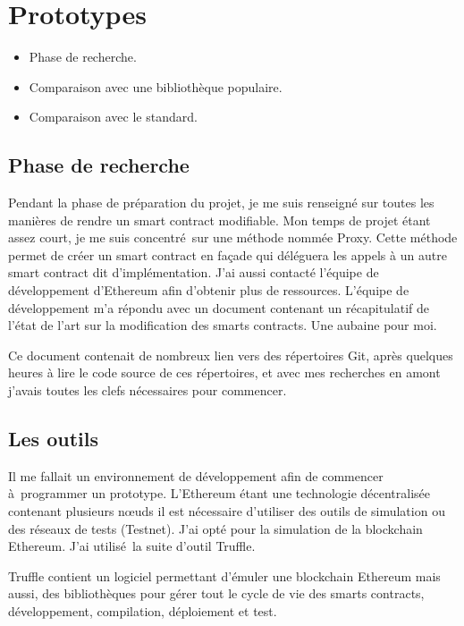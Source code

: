 \section{Prototypes}

\begin{itemize}
    \item Phase de recherche.
    \item Comparaison avec une bibliothèque populaire.
    \item Comparaison avec le standard.
\end{itemize}

\subsection{Phase de recherche}

Pendant la phase de préparation du projet, je me suis renseigné sur toutes les manières de rendre un smart contract modifiable.
Mon temps de projet étant assez court, je me suis concentré sur une méthode nommée Proxy. Cette méthode permet de créer un
smart contract en façade qui déléguera les appels à un autre smart contract dit d'implémentation. J'ai aussi contacté
l'équipe de développement d'Ethereum afin d'obtenir plus de ressources. L'équipe de développement m'a répondu avec un document
contenant un récapitulatif de l'état de l'art sur la modification des smarts contracts. Une aubaine pour moi.

Ce document contenait de nombreux lien vers des répertoires Git, après quelques heures à lire le code source de ces répertoires,
et avec mes recherches en amont j'avais toutes les clefs nécessaires pour commencer. 

\subsection{Les outils}

Il me fallait un environnement de développement afin de commencer à programmer un prototype. L'Ethereum étant une technologie
décentralisée contenant plusieurs nœuds il est nécessaire d'utiliser des outils de simulation ou des réseaux de tests (Testnet).
J'ai opté pour la simulation de la blockchain Ethereum. J'ai utilisé la suite d'outil Truffle.

Truffle contient un logiciel permettant d'émuler une blockchain Ethereum mais aussi, des bibliothèques pour gérer tout le cycle 
de vie des smarts contracts, développement, compilation, déploiement et test.

